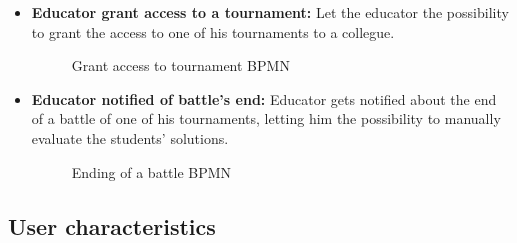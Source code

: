 \documentclass{article}
\begin{document}
{\begin{itemize}
            \item \textbf{Educator grant access to a tournament:} Let the educator the possibility to grant the access to one of his tournaments to a collegue.
            \begin{figure}[H]
                \centering
                \caption{Grant access to tournament BPMN}
                \label{fig:accessGrantTournamentBPMN}
            \end{figure}

            \item \textbf{Educator notified of battle's end:} Educator gets notified about the end of a battle of one of his tournaments, letting him the possibility to manually evaluate the students' solutions.
            \begin{figure}[H]
                \centering
                \caption{Ending of a battle BPMN}
                \label{fig:battleEndingBPMN}
            \end{figure}
        \end{itemize}
\subsection{User characteristics}
}
\end{document}
